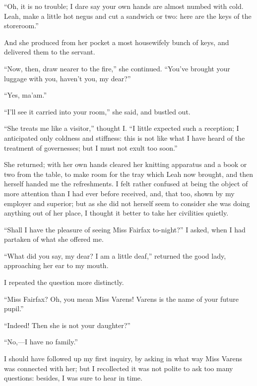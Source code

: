 \enquote{Oh, it is no trouble; I dare say your own hands are almost
numbed with cold. Leah, make a little hot negus and cut a sandwich or
two: here are the keys of the storeroom.}

And she produced from her pocket a most housewifely bunch of keys, and
delivered them to the servant.

\enquote{Now, then, draw nearer to the fire,} she continued. 
\enquote{You've brought your luggage with you, haven't you, my dear?}

\enquote{Yes, ma'am.}

\enquote{I'll see it carried into your room,} she said, and bustled out.

\enquote{She treats me like a visitor,} thought I\@. \enquote{I little
expected such a reception; I anticipated only coldness and stiffness:
this is not like what I have heard of the treatment of governesses; but
I must not exult too soon.}

She returned; with her own hands cleared her knitting apparatus and a
book or two from the table, to make room for the tray which Leah now
brought, and then herself handed me the refreshments. I felt rather
confused at being the object of more attention than I had ever before
received, and, that too, shown by my employer and superior; but as she
did not herself seem to consider she was doing anything out of her
place, I thought it better to take her civilities quietly.

\enquote{Shall I have the pleasure of seeing Miss Fairfax to-night?} I
asked, when I had partaken of what she offered me.

\enquote{What did you say, my dear? I am a little deaf,} returned the
good lady, approaching her ear to my mouth.

I repeated the question more distinctly.

\enquote{Miss Fairfax? Oh, you mean Miss Varens! Varens is the name of
your future pupil.}

\enquote{Indeed! Then she is not your daughter?}

\enquote{No,---I have no family.}

I should have followed up my first inquiry, by asking in what way Miss
Varens was connected with her; but I recollected it was not polite to
ask too many questions: besides, I was sure to hear in time.


